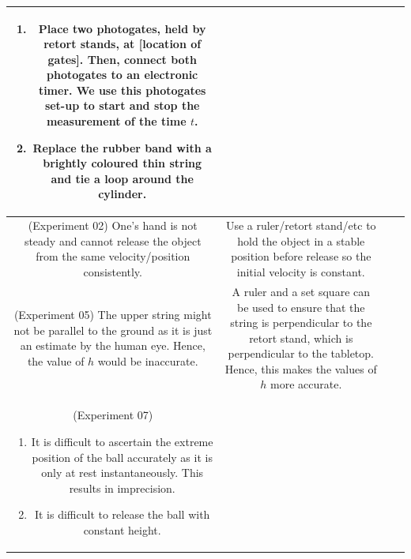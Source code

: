 \documentclass[oneside]{book}
\begin{document}
\begin{itemize}
\begin{longtable}{|Sc|Sc|}
\begin{minipage}{0.5\textwidth-25.2pt}
            \begin{enumerate}
                \item Place two photogates, held by retort stands, at [location of gates]. Then, connect both photogates to an electronic timer. We use this photogates set-up to start and stop the measurement of the time \(t\).
                \item Replace the rubber band with a brightly coloured thin string and tie a loop around the cylinder.
            \end{enumerate}
        \end{minipage}\\
        \hline
        \begin{minipage}{0.5\textwidth-25.2pt}
            (Experiment 02) One's hand is not steady and cannot release the object from the same velocity/position consistently.
        \end{minipage}& 
        \begin{minipage}{0.5\textwidth-25.2pt}
            Use a ruler/retort stand/etc to hold the object in a stable position before release so the initial velocity is constant.
        \end{minipage}\\
        \hline
        \begin{minipage}{0.5\textwidth-25.2pt}
            (Experiment 05) The upper string might not be parallel to the ground as it is just an estimate by the human eye. Hence, the value of \(h\) would be inaccurate.
        \end{minipage}&
        \begin{minipage}{0.5\textwidth-25.2pt}
            A ruler and a set square can be used to ensure that the string is perpendicular to the retort stand, which is perpendicular to the tabletop. Hence, this makes the values of \(h\) more accurate.
        \end{minipage}\\
        \hline
        \begin{minipage}{0.5\textwidth-25.2pt}
            (Experiment 07) 
            \begin{enumerate}
                \item It is difficult to ascertain the extreme position of the ball accurately as it is only at rest instantaneously. This results in imprecision.
                \item It is difficult to release the ball with constant height.
            \end{enumerate}

\end{minipage}
\end{longtable}
\end{itemize}
\end{document}
